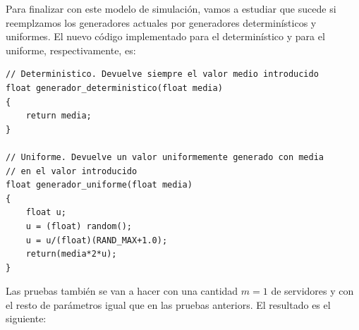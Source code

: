 \documentclass[11pt,a4paper]{report}
\begin{document}
\newpage
Para finalizar con este modelo de simulación, vamos a estudiar que sucede si reemplzamos los generadores actuales por generadores determinísticos y uniformes.
El nuevo código implementado para el determinístico y para el uniforme, respectivamente, es:
\begin{lstlisting}
// Deterministico. Devuelve siempre el valor medio introducido
float generador_deterministico(float media)
{
	return media;
}

// Uniforme. Devuelve un valor uniformemente generado con media
// en el valor introducido
float generador_uniforme(float media)
{
	float u;
	u = (float) random();
	u = u/(float)(RAND_MAX+1.0);
	return(media*2*u);
}
\end{lstlisting}

Las pruebas también se van a hacer con una cantidad $m=1$ de servidores y con el resto de parámetros igual que en las pruebas anteriors. El resultado es el
siguiente:
\end{document}
